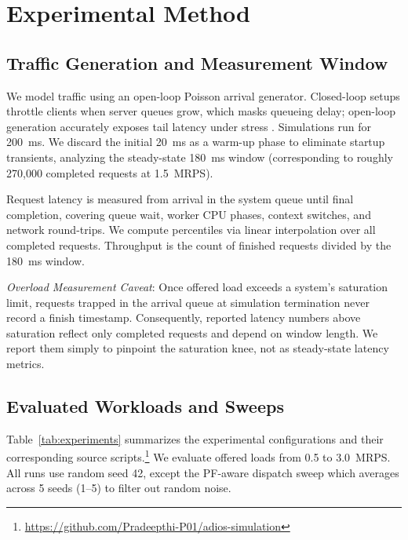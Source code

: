 \section{Experimental Method}
\label{sec:method}

\subsection{Traffic Generation and Measurement Window}
We model traffic using an open-loop Poisson arrival generator. Closed-loop setups throttle clients when server queues grow, which masks queueing delay; open-loop generation accurately exposes tail latency under stress \cite{leverich}. Simulations run for 200~ms. We discard the initial 20~ms as a warm-up phase to eliminate startup transients, analyzing the steady-state 180~ms window (corresponding to roughly 270{,}000 completed requests at 1.5~MRPS).

Request latency is measured from arrival in the system queue until final completion, covering queue wait, worker CPU phases, context switches, and network round-trips. We compute percentiles via linear interpolation over all completed requests. Throughput is the count of finished requests divided by the 180~ms window.

\emph{Overload Measurement Caveat}: Once offered load exceeds a system's saturation limit, requests trapped in the arrival queue at simulation termination never record a finish timestamp. Consequently, reported latency numbers above saturation reflect only completed requests and depend on window length. We report them simply to pinpoint the saturation knee, not as steady-state latency metrics.

\subsection{Evaluated Workloads and Sweeps}
Table~\ref{tab:experiments} summarizes the experimental configurations and their corresponding source scripts.\footnote{\url{https://github.com/Pradeepthi-P01/adios-simulation}} We evaluate offered loads from 0.5 to 3.0~MRPS. All runs use random seed 42, except the PF-aware dispatch sweep which averages across 5 seeds (1--5) to filter out random noise.

